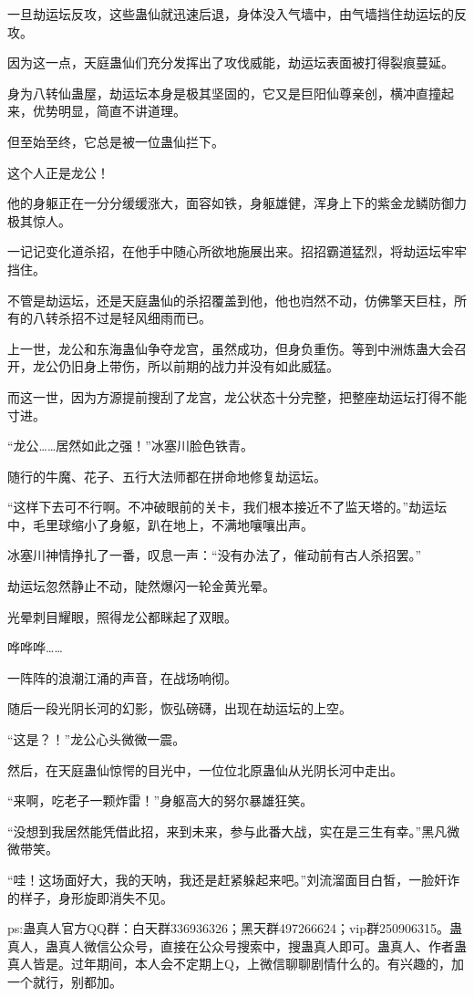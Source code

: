 \begin{this_body}
一旦劫运坛反攻，这些蛊仙就迅速后退，身体没入气墙中，由气墙挡住劫运坛的反攻。

因为这一点，天庭蛊仙们充分发挥出了攻伐威能，劫运坛表面被打得裂痕蔓延。

身为八转仙蛊屋，劫运坛本身是极其坚固的，它又是巨阳仙尊亲创，横冲直撞起来，优势明显，简直不讲道理。

但至始至终，它总是被一位蛊仙拦下。

这个人正是龙公！

他的身躯正在一分分缓缓涨大，面容如铁，身躯雄健，浑身上下的紫金龙鳞防御力极其惊人。

一记记变化道杀招，在他手中随心所欲地施展出来。招招霸道猛烈，将劫运坛牢牢挡住。

不管是劫运坛，还是天庭蛊仙的杀招覆盖到他，他也岿然不动，仿佛擎天巨柱，所有的八转杀招不过是轻风细雨而已。

上一世，龙公和东海蛊仙争夺龙宫，虽然成功，但身负重伤。等到中洲炼蛊大会召开，龙公仍旧身上带伤，所以前期的战力并没有如此威猛。

而这一世，因为方源提前搜刮了龙宫，龙公状态十分完整，把整座劫运坛打得不能寸进。

“龙公……居然如此之强！”冰塞川脸色铁青。

随行的牛魔、花子、五行大法师都在拼命地修复劫运坛。

“这样下去可不行啊。不冲破眼前的关卡，我们根本接近不了监天塔的。”劫运坛中，毛里球缩小了身躯，趴在地上，不满地嚷嚷出声。

冰塞川神情挣扎了一番，叹息一声：“没有办法了，催动前有古人杀招罢。”

劫运坛忽然静止不动，陡然爆闪一轮金黄光晕。

光晕刺目耀眼，照得龙公都眯起了双眼。

哗哗哗……

一阵阵的浪潮江涌的声音，在战场响彻。

随后一段光阴长河的幻影，恢弘磅礴，出现在劫运坛的上空。

“这是？！”龙公心头微微一震。

然后，在天庭蛊仙惊愕的目光中，一位位北原蛊仙从光阴长河中走出。

“来啊，吃老子一颗炸雷！”身躯高大的努尔暴雄狂笑。

“没想到我居然能凭借此招，来到未来，参与此番大战，实在是三生有幸。”黑凡微微带笑。

“哇！这场面好大，我的天呐，我还是赶紧躲起来吧。”刘流溜面目白皙，一脸奸诈的样子，身形旋即消失不见。

ps:蛊真人官方QQ群：白天群336936326；黑天群497266624；vip群250906315。蛊真人，蛊真人微信公众号，直接在公众号搜索中，搜蛊真人即可。蛊真人、作者蛊真人皆是。过年期间，本人会不定期上Q，上微信聊聊剧情什么的。有兴趣的，加一个就行，别都加。

\end{this_body}

